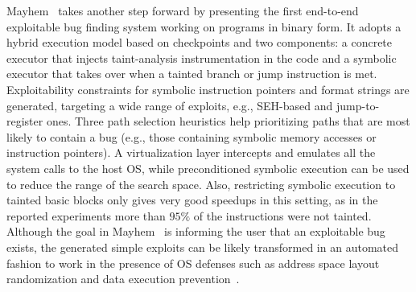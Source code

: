 {\sc Mayhem}~\cite{MAYHEM-SP12} takes another step forward by presenting the first end-to-end exploitable bug finding system working on programs in binary form. It adopts a hybrid execution model based on checkpoints and two components: a concrete executor that injects taint-analysis instrumentation in the code and a symbolic executor that takes over when a tainted branch or jump instruction is met. Exploitability constraints for symbolic instruction pointers and format strings are generated, targeting a wide range of exploits, e.g., SEH-based and jump-to-register ones. Three path selection heuristics help prioritizing paths that are most likely to contain a bug (e.g., those containing symbolic memory accesses or instruction pointers). A virtualization layer intercepts and emulates all the system calls to the host OS, while preconditioned symbolic execution can be used to reduce the range of the search space. Also, restricting symbolic execution to tainted basic blocks only gives very good speedups in this setting, as in the reported experiments more than $95\%$ of the instructions were not tainted. Although the goal in {\sc Mayhem}~\cite{MAYHEM-SP12} is informing the user that an exploitable bug exists, the generated simple exploits can be likely transformed in an automated fashion to work in the presence of OS defenses such as address space layout randomization and data execution prevention~\cite{Q-SEC11}. 

